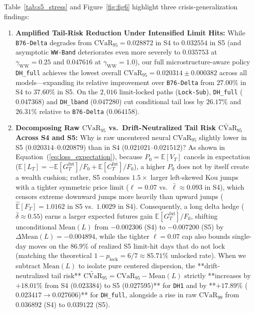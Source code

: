 \documentclass[11pt,a4paper]{article}
\begin{document}
Table~\ref{tab:s5_stress} and Figure~\ref{fig:fig6} highlight three crisis-generalization findings:
\begin{enumerate}
  \item \textbf{Amplified Tail-Risk Reduction Under Intensified Limit Hits:} While \texttt{B76-Delta} degrades from $\text{CVaR}_{95} = 0.028872$ in S4 to $0.032554$ in S5 (and asymptotic \texttt{WW-Band} deteriorates even more severely to $0.035753$ at $\gamma_{\text{WW}}=0.25$ and $0.047616$ at $\gamma_{\text{WW}}=1.0$), our full microstructure-aware policy \texttt{DH\_full} achieves the lowest overall $\text{CVaR}_{95} = 0.020314 \pm 0.000382$ across all models---expanding its relative improvement over \texttt{B76-Delta} from $27.00\%$ in S4 to $37.60\%$ in S5. On the $2,016$ limit-locked paths (\texttt{Lock-Sub}), \texttt{DH\_full} ($0.047368$) and \texttt{DH\_lband} ($0.047280$) cut conditional tail loss by $26.17\%$ and $26.31\%$ relative to \texttt{B76-Delta} ($0.064158$).
  \item \textbf{Decomposing Raw $\text{CVaR}_{95}$ vs.\ Drift-Neutralized Tail Risk $\widetilde{\text{CVaR}}_{95}$ Across S4 and S5:} Why is raw uncentered neural $\text{CVaR}_{95}$ slightly lower in S5 ($0.020314\text{--}0.020879$) than in S4 ($0.021021\text{--}0.021512$)? As shown in Equation~(\ref{eq:loss_expectation}), because $P_0 = \widehat{\mathbb{E}}[V_T]$ cancels in expectation ($\mathbb{E}[L_T] = -\mathbb{E}[G_T^{\text{fut}}]/F_0 + \mathbb{E}[C_T^{\text{fut}}]/F_0$), a higher $P_0$ does not by itself create a wealth cushion; rather, S5 combines $1.5\times$ larger left-skewed Kou jumps with a tighter symmetric price limit ($\ell = 0.07$ vs.\ $\bar{\ell} \approx 0.093$ in S4), which censors extreme downward jumps more heavily than upward jumps ($\widehat{\mathbb{E}}[F_T] = 1.0162$ in S5 vs.\ $1.0029$ in S4). Consequently, a long delta hedge ($\bar{\delta} \approx 0.55$) earns a larger expected futures gain $\mathbb{E}[G_T^{\text{fut}}]/F_0$, shifting unconditional $\text{Mean}(L)$ from $-0.002306$ (S4) to $-0.007200$ (S5) by $\Delta\text{Mean}(L) = -0.004894$, while the tighter $\ell = 0.07$ cap also bounds single-day moves on the $86.9\%$ of realized S5 limit-hit days that do not lock (matching the theoretical $1 - p_{\text{lock}} = 6/7 \approx 85.71\%$ unlocked rate). When we subtract $\text{Mean}(L)$ to isolate pure centered dispersion, the **drift-neutralized tail risk** $\widetilde{\text{CVaR}}_{95} = \text{CVaR}_{95} - \text{Mean}(L)$ strictly **increases by $+18.01\%$ from S4 ($0.023384$) to S5 ($0.027595$)** for \texttt{DH1} and by **$+17.89\%$ ($0.023417 \to 0.027606$)** for \texttt{DH\_full}, alongside a rise in raw $\text{CVaR}_{99}$ from $0.036892$ (S4) to $0.039122$ (S5).

\end{enumerate}
\end{document}
